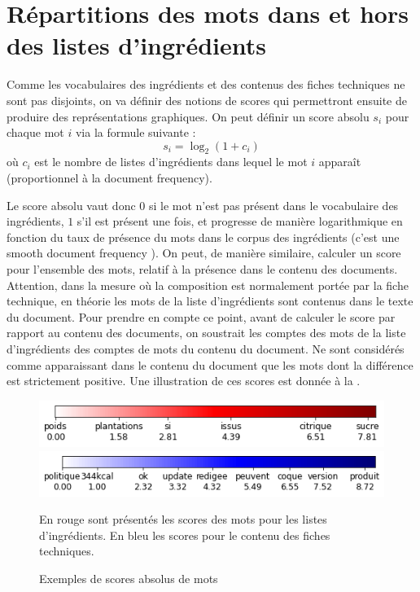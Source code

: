         \section{Répartitions des mots dans et hors des listes d'ingrédients}
        \label{word_scores}
        
        Comme les vocabulaires des ingrédients et des contenus des fiches techniques ne sont pas disjoints, on va définir des notions de \og scores \fg qui permettront ensuite de produire des représentations graphiques.
        On peut définir un score absolu $s_{i}$ pour chaque mot $i$ via la formule suivante :
        \[s_{i} = \log_{2}(1 + c_{i})\]
        où $c_{i}$ est le nombre de listes d'ingrédients dans lequel le mot $i$ apparaît (proportionnel à la document frequency).
       
        Le score absolu vaut donc $0$ si le mot n'est pas présent dans le vocabulaire des ingrédients, $1$ s'il est présent une fois, et progresse de manière logarithmique en fonction du taux de présence du mots dans le corpus des ingrédients (c'est une \og smooth document frequency \fg).
        On peut, de manière similaire, calculer un score pour l'ensemble des mots, relatif à la présence dans le contenu des documents.
        Attention, dans la mesure où la composition est normalement portée par la fiche technique, en théorie les mots de la liste d'ingrédients sont contenus dans le texte du document.
        Pour prendre en compte ce point, avant de calculer le score par rapport au contenu des documents, on soustrait les comptes des mots de la liste d'ingrédients des comptes de mots du contenu du document.
        Ne sont considérés comme apparaissant dans le contenu du document que les mots dont la différence est strictement positive.
        Une illustration de ces scores est donnée à la .

        \begin{figure}[htbp]
            \begin{center}
            \includegraphics[width=0.6\linewidth]{img/scores_bar.png}
            \includegraphics[width=0.6\linewidth]{img/corpus_score_bar.png}
            \caption{Exemples de scores absolus de mots}
            \label{fig:scores_bar}
            En rouge sont présentés les scores des mots pour les listes d'ingrédients. En bleu les scores pour le contenu des fiches techniques.
            \end{center}            
        \end{figure}

